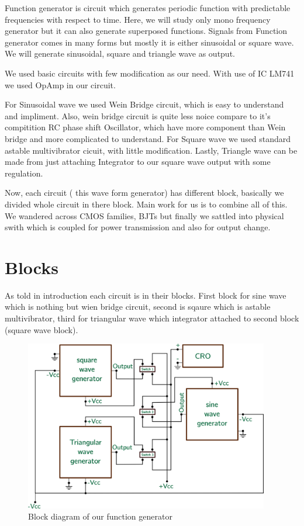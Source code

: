 \documentclass[14pt,a4paper]{extarticle}
\begin{document}
Function generator is circuit which generates periodic function with predictable frequencies with respect to time. Here, we will study only mono frequency generator but it can also generate superposed functions. Signals from Function generator comes in many forms but mostly it is either sinusoidal or square wave. We will generate sinusoidal, square and triangle wave as output. 

We used basic circuits with few modification as our need. With use of IC LM741 we used OpAmp in our circuit.

For Sinusoidal wave we used Wein Bridge circuit, which is easy to understand and impliment. Also, wein bridge circuit is quite less noice compare to it's compitition RC phase shift Oscillator, which have more component than Wein bridge and more complicated to understand. For Square wave we used standard astable multivibrator cicuit, with little modification. Lastly, Triangle wave can be made from just attaching Integrator to our square wave output with some regulation.

Now, each circuit ( this wave form generator) has different block, basically we divided whole circuit in there block. Main work for us is to combine all of this. We wandered across CMOS families, BJTs but finally we sattled into physical swith which is coupled for power transmission and also for output change.\cite{gayakwad2012op} \cite{horowitz1989art}\cite{wiki}

\section{Blocks}
\label{sec:org4d403e5}



As told in introduction each circuit is in their blocks. First block for sine wave which is nothing but wien bridge circuit, second is sqaure which is astable multivibrator, third for triangular wave which integrator attached to second block (square wave block).


\begin{figure}[ht]
    \centering
    \includegraphics[width=0.95\textwidth]{imgs/blocks.png}
    \caption{Block diagram of our function generator}
    \label{fig:block}
\end{figure}
\end{document}

